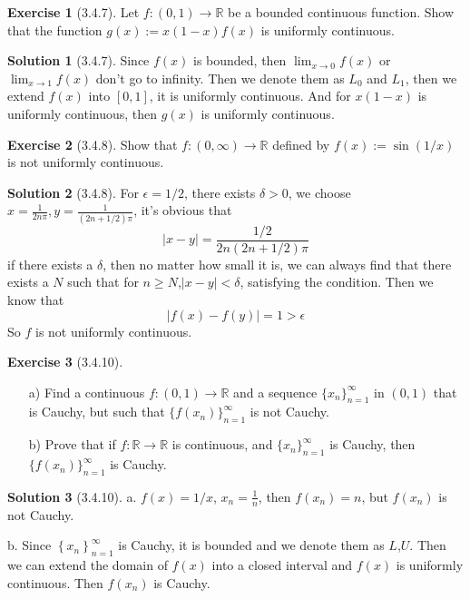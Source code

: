 \documentclass{article}
\theoremstyle{definition}
\newtheorem{exe}{Exercise}[section]
\newtheorem{sol}{Solution}[exe]
\begin{document}
\begin{exe}[3.4.7]
    Let \( f: (0,1) \rightarrow \mathbb{R} \) be a bounded continuous function. Show that the function \( g(x) := x(1-x) f(x) \) is uniformly continuous.
\end{exe}

\begin{sol}[3.4.7]

Since $f(x)$ is bounded, then $\lim_{x\to 0}f(x)$ or $\lim_{x\to 1}f(x)$ don't go to infinity. Then we denote them as $L_0$ and $L_1$, then we extend $f(x)$ into $[0,1]$, it is uniformly continuous. 
And for $x(1-x)$ is uniformly continuous, then $g(x)$ is uniformly continuous.
\end{sol}


\begin{exe}[3.4.8]
    Show that \( f: (0,\infty) \rightarrow \mathbb{R} \) defined by \( f(x) := \sin(1/x) \) is not uniformly continuous.
\end{exe}

\begin{sol}[3.4.8]

For $\epsilon=1/2$, there exists $\delta>0$, we choose $x= \frac{1}{2n\pi},y=\frac{1}{(2n+1/2)\pi}$, it's obvious that 
$$|x-y|=\frac{1/2}{2n(2n+1/2)\pi}$$
if there exists a $\delta$, then no matter how small it is, we can always find that there exists a $N$ such that for $n\geq N$,$|x-y|<\delta$, satisfying the condition. Then we know that 
$$|f(x)-f(y)|=1>\epsilon$$
So $f$ is not uniformly continuous.
\end{sol}



\begin{exe}[3.4.10]
    \begin{enumerate}
        \item[a)] Find a continuous \( f: (0,1) \rightarrow \mathbb{R} \) and a sequence \( \{x_n\}_{n=1}^{\infty} \) in \( (0,1) \) that is Cauchy, but such that \( \{f(x_n)\}_{n=1}^{\infty} \) is not Cauchy.
        \item[b)] Prove that if \( f: \mathbb{R} \rightarrow \mathbb{R} \) is continuous, and \( \{x_n\}_{n=1}^{\infty} \) is Cauchy, then \( \{f(x_n)\}_{n=1}^{\infty} \) is Cauchy.
    \end{enumerate}
\end{exe}

\begin{sol}[3.4.10]
a. $f(x)=1/x$, $x_n=\frac{1}{n}$, then $f(x_n)=n$, but $f(x_n)$ is not Cauchy.

b. Since $\left\{x_n\right\}_{n=1}^{\infty}$ is Cauchy, it is bounded and we denote them as $L$,$U$. Then we can extend the domain of $f(x)$ into a closed interval and $f(x)$ is uniformly continuous. Then $f(x_n)$ is Cauchy.
\end{sol}
\end{document}
